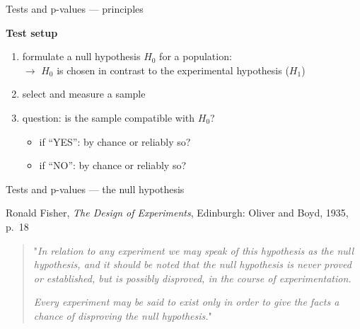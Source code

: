 \documentclass[
  ignorenonframetext,
  aspectratio=169,
  t]{beamer}
\providecommand{\tightlist}{%
  \setlength{\itemsep}{0pt}\setlength{\parskip}{0pt}}
\newcommand{\bluenorm}[1]{\textcolor{bluebeamer}{#1}}
\newcommand{\bluebold}[1]{\textcolor{bluebeamer}{\textbf{#1}}}
\begin{document}
\begin{frame}{Tests and p-values --- principles}
\protect{}\label{tests-and-p-values-principles}
\vspace{1cm}

\bluebold{Test setup}

\begin{enumerate}
\tightlist
\item
  formulate a null hypothesis \(H_0\) for a population:\\
  \(\rightarrow\) \(H_0\) is chosen in contrast to the experimental
  hypothesis (\(H_1\))
\item
  select and measure a sample
\item
  question: is the sample compatible with \(H_0\)?

  \begin{itemize}
  \tightlist
  \item
    if ``YES'': by chance or reliably so?
  \item
    if ``NO'': by chance or reliably so?
  \end{itemize}
\end{enumerate}
\end{frame}

\begin{frame}{Tests and p-values --- the null hypothesis}
\protect{}\label{tests-and-p-values-the-null-hypothesis}
\vspace{1cm}

Ronald Fisher, \emph{The Design of Experiments}, Edinburgh: Oliver and
Boyd, 1935, p.~18

\vspace{0.5cm}

\begin{quote}
"\emph{In relation to any experiment we may speak of this hypothesis as the \bluenorm{null hypothesis}, and it should be noted that the null hypothesis is never proved or established, but is possibly disproved, in the course of experimentation.}

\vspace{1cm}

\emph{Every experiment may be said to exist only in order to give the facts a chance of disproving the null hypothesis.}"
\end{quote}
\end{frame}
\end{document}
